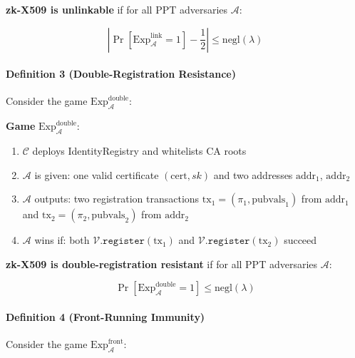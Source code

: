 \documentclass[11pt, a4paper]{article}
\begin{document}
\textbf{zk-X509 is unlinkable} if for all PPT adversaries
\(\mathcal{A}\):

\[\left| \Pr[\text{Exp}_{\mathcal{A}}^{\text{link}} = 1] - \frac{1}{2} \right| \leq \text{negl}(\lambda)\]

\paragraph{Definition 3 (Double-Registration
Resistance)}\label{definition-3-double-registration-resistance}

Consider the game \(\text{Exp}_{\mathcal{A}}^{\text{double}}\):

\begin{mdframed}[linewidth=0.5pt, innertopmargin=6pt, innerbottommargin=6pt]
\small
\textbf{Game} $\text{Exp}_{\mathcal{A}}^{\text{double}}$:
\begin{enumerate}[nosep,leftmargin=1.5em]
\item $\mathcal{C}$ deploys IdentityRegistry and whitelists CA roots
\item $\mathcal{A}$ is given: one valid certificate $(\text{cert}, sk)$ and two addresses $\text{addr}_1$, $\text{addr}_2$
\item $\mathcal{A}$ outputs: two registration transactions $\text{tx}_1 = (\pi_1, \text{pubvals}_1)$ from $\text{addr}_1$ and $\text{tx}_2 = (\pi_2, \text{pubvals}_2)$ from $\text{addr}_2$
\item $\mathcal{A}$ wins if: both $\mathcal{V}.\texttt{register}(\text{tx}_1)$ and $\mathcal{V}.\texttt{register}(\text{tx}_2)$ succeed
\end{enumerate}
\end{mdframed}

\textbf{zk-X509 is double-registration resistant} if for all PPT
adversaries \(\mathcal{A}\):

\[\Pr[\text{Exp}_{\mathcal{A}}^{\text{double}} = 1] \leq \text{negl}(\lambda)\]

\paragraph{Definition 4 (Front-Running
Immunity)}\label{definition-4-front-running-immunity}

Consider the game \(\text{Exp}_{\mathcal{A}}^{\text{front}}\):
\end{document}
